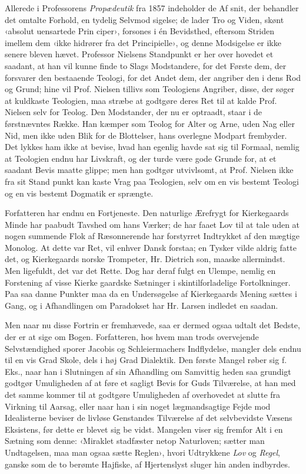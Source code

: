 \documentclass[12pt,a4paper,openany]{book}
\newcommand{\opage}[1]{\marginnote{\footnotesize\textit{[#1]}}}
\begin{document}
Allerede i Professorens \emph{Propædeutik} fra 1857 indeholder de Af\-%
snit, der behandler det omtalte Forhold, en tydelig Selvmod\-%
sigelse; de lader Tro og Viden, skønt ‹absolut uensartede Prin\-%
ciper›, forsones i én Bevidsthed, eftersom Striden imellem dem
‹ikke hidrører fra det Principielle›, og denne Modsigelse er ikke
senere bleven hævet. Professor Nielsens Standpunkt er her over\-%
hovedet et saadant, at han vil kunne finde to Slags Modstandere,
for det Første dem, der forsvarer den bestaaende Teologi, for
\opage{9}det Andet dem, der angriber den i dens Rod og Grund; hine
vil Prof. Nielsen tillivs som Teologiens Angriber, disse, der søger
at kuldkaste Teologien, maa stræbe at godtgøre deres Ret til at
kalde Prof. Nielsen selv for Teolog. Den Modstander, der nu
er optraadt, staar i de førstnævntes Række. Han kæmper som
Teolog for Alter og Arne, uden Nag eller Nid, men ikke uden
Blik for de Blottelser, hans overlegne Modpart frembyder.
Det lykkes ham ikke at bevise, hvad han egenlig havde sat sig
til Formaal, nemlig at Teologien endnu har Livskraft, og der
turde være gode Grunde for, at et saadant Bevis maatte glippe;
men han godtgør utvivlsomt, at Prof. Nielsen ikke fra sit Stand\-%
punkt kan kaste Vrag paa Teologien, selv om en vis bestemt
Teologi og en vis bestemt Dogmatik er sprængte.

Forfatteren har endnu en Fortjeneste. Den naturlige Ærefrygt
for Kierkegaards Minde har paabudt Tavshed om hans Værker;
de har faaet Lov til at tale uden at nogen summende Flok af
Ræsonnerende har forstyrret Indtrykket af den mægtige Monolog.
At dette var Ret, vil enhver Dansk forstaa; en Tysker vilde
aldrig fatte det, og Kierkegaards norske Trompeter, Hr. Dietrich\-%
son, maaske allermindst. Men ligefuldt, det var det Rette. Dog
har deraf fulgt en Ulempe, nemlig en Forstening af visse Kierke\-%
gaardske Sætninger i skintilforladelige Fortolkninger. Paa saa\-%
danne Punkter maa da en Undersøgelse af Kierkegaards Mening
sættes i Gang, og i Afhandlingen om Paradokset har Hr. Larsen
indledet en saadan.

Men naar nu disse Fortrin er fremhævede, saa er dermed
ogsaa udtalt det Bedste, der er at sige om Bogen. Forfatteren, hos
hvem man trods overvejende Selvstændighed sporer Jacobis og
Schleiermachers Indflydelse, mangler dels endnu til en vis Grad
Skole, dels i høj Grad Dialektik. Den første Mangel røber sig
f. Eks., naar han i Slutningen af sin Afhandling om Samvittig\-%
heden saa grundigt godtgør Umuligheden af at føre et sagligt
Bevis for Guds Tilværelse, at han med det samme kommer til
at godtgøre Umuligheden af overhovedet at slutte fra Virkning
til Aarsag, eller naar han i sin noget lægmandsagtige Fejde
mod Idealisterne beviser de livløse Genstandes Tilværelse af
det selvbevidste Væsens Eksistens, før dette er blevet sig be\-%
vidst. Mangelen viser sig fremfor Alt i en Sætning som denne:
‹Miraklet stadfæster netop Naturloven; sætter man Undtagelsen,
maa man ogsaa sætte Reglen›, hvori Udtrykkene \emph{Lov} og \emph{Regel},
\opage{10}ganske som de to berømte Hajfiske, af Hjertenslyst sluger hin\-%
anden indbyrdes.
\end{document}
